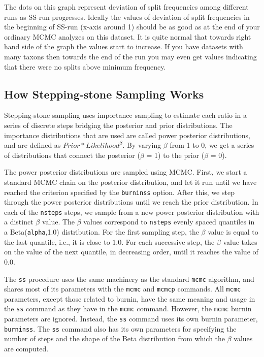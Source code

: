 \documentclass[12pt]{book}
\newcommand{\ttt}[1]{\texttt{#1}}
\begin{document}
The dots on this graph represent deviation of split frequencies among different runs as SS-run
progresses. Ideally the values of deviation of split frequencies in the beginning of SS-run (x-axis
around 1) should be as good as at the end of your ordinary MCMC analyzes on this dataset. It is
quite normal that towards right hand side of the graph the values start to increase. If you have
datasets with many taxons then towards the end of the run you may even get values indicating that
there were no splits above minimum frequency.

\subsection{How Stepping-stone Sampling Works}

Stepping-stone sampling uses importance sampling to estimate each ratio in a series of discrete
steps bridging the posterior and prior distributions. The importance distributions that are used
are called power posterior distributions, and are defined as $Prior*Likelihood^{\beta}$. By varying
$\beta$ from 1 to 0, we get a series of distributions that connect the posterior ($\beta$ = 1) to
the prior ($\beta$ = 0).

The power posterior distributions are sampled using MCMC. First, we start a standard MCMC chain on
the posterior distribution, and let it run until we have reached the criterion specified by the
\ttt{burninss} option. After this, we step through the power posterior distributions until we reach
the prior distribution. In each of the \ttt{nsteps} steps, we sample from a new power posterior
distribution with a distinct $\beta$ value. The $\beta$ values correspond to \ttt{nsteps} evenly
spaced quantiles in a Beta(\ttt{alpha},1.0) distribution. For the first sampling step, the $\beta$
value is equal to the last quantile, i.e., it is close to $1.0$. For each successive step, the
$\beta$ value takes on the value of the next quantile, in decreasing order, until it reaches the
value of $0.0$.

The \ttt{ss} procedure uses the same machinery as the standard \ttt{mcmc} algorithm, and shares
most of its parameters with the \ttt{mcmc} and \ttt{mcmcp} commands. All \ttt{mcmc} parameters,
except those related to burnin, have the same meaning and usage in the \ttt{ss} command as they
have in the \ttt{mcmc} command. However, the \ttt{mcmc} burnin parameters are ignored. Instead, the
\ttt{ss} command uses its own burnin parameter, \ttt{burninss}. The \ttt{ss} command also has its
own parameters for specifying the number of steps and the shape of the Beta distribution from which
the $\beta$ values are computed.
\end{document}
